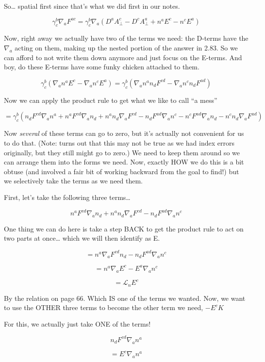 \documentclass[landscape,letterpaper,10pt,english]{article}
\begin{document}
So\ldots{} spatial first since that's what we did first in our notes.

    \[\gamma^b_c \nabla_a F^{ac} = \gamma^b_c \nabla_a (D^a A_\perp^c - D^c A_\perp^a + n^aE^c - n^cE^a)\]

Now, right away we actually have two of the terms we need: the D-terms
have the \(\nabla_a\) acting on them, making up the nested portion of
the answer in 2.83. So we can afford to not write them down anymore and
just focus on the E-terms. And boy, do these E-terms have some funky
chicken attached to them.

\[ \gamma^b_c (\nabla_a n^aE^c - \nabla_a n^cE^a) = \gamma^b_c (\nabla_a n^a n_d F^{cd} - \nabla_a n^c n_d F^{ad}) \]

Now we can apply the product rule to get what we like to call ``a mess''

\[ = \gamma^b_c ( n_d F^{cd}\nabla_an^a + n^a F^{cd}\nabla_a n_d + n^a n_d \nabla_aF^{cd} - n_d F^{ad} \nabla_a n^c - n^c F^{ad} \nabla_a n_d - n^c n_d \nabla_a F^{ad}) \]

Now \emph{several} of these terms can go to zero, but it's actually not
convenient for us to do that. (Note: turns out that this may not be true
as we had index errors originally, but they still might go to zero.) We
need to keep them around so we can arrange them into the forms we need.
Now, exactly HOW we do this is a bit obtuse (and involved a fair bit of
working backward from the goal to find!) but we selectively take the
terms as we need them.

First, let's take the following three terms\ldots{}

\[ n^a F^{cd}\nabla_a n_d + n^a n_d \nabla_aF^{cd} - n_d F^{ad} \nabla_a n^c \]

One thing we can do here is take a step BACK to get the product rule to
act on two parts at once\ldots{} which we will then identify as E.

\[ = n^a \nabla_a F^{cd} n_d - n_d F^{ad} \nabla_a n^c \]

\[ = n^a \nabla_a E^c - E^a \nabla_a n^c \]

\[ = \mathcal{L}_n E^c \]

By the relation on page 66. Which IS one of the terms we wanted. Now, we
want to use the OTHER three terms to become the other term we need,
\(-E^cK\)

    For this, we actually just take ONE of the terms!

\[ n_d F^{cd} \nabla_a n^a \]

\[ = E^c \nabla_a n^a \]
\end{document}
